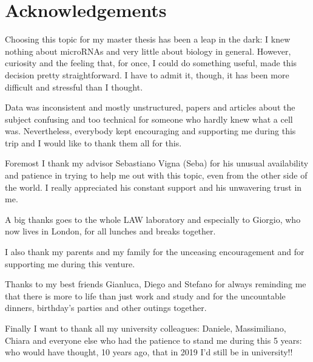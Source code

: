 \chapter*{Acknowledgements}

Choosing this topic for my master thesis has been a leap in the dark: I knew nothing about microRNAs and very little about biology in general. However, curiosity and the feeling that, for once, I could do something useful, made this decision pretty straightforward. I have to admit it, though, it has been more difficult and stressful than I thought.

Data was inconsistent and mostly unstructured, papers and articles about the subject confusing and too technical for someone who hardly knew what a cell was. Nevertheless, everybody kept encouraging and supporting me during this trip and I would like to thank them all for this.

Foremost I thank my advisor Sebastiano Vigna (Seba) for his unusual availability and patience in trying to help me out with this topic, even from the other side of the world. I really appreciated his constant support and his unwavering trust in me.  

A big thanks goes to the whole LAW laboratory and especially to Giorgio, who now lives in London, for all lunches and breaks together.

I also thank my parents and my family for the unceasing encouragement and for supporting me during this venture.

Thanks to my best friends Gianluca, Diego and Stefano for always reminding me that there is more to life than just work and study and for the uncountable dinners, birthday's parties and other outings together.

Finally I want to thank all my university colleagues: Daniele, Massimiliano, Chiara and everyone else who had the patience to stand me during this 5 years: who would have thought, 10 years ago, that in 2019 I'd still be in university!! 